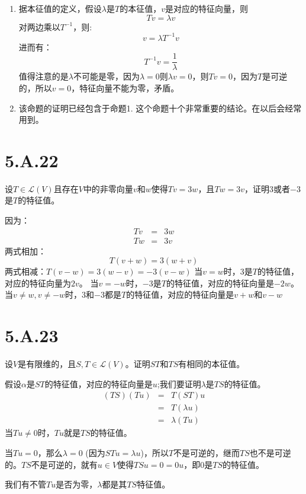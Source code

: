 \documentclass[10pt,a4paper,UTF8]{article}
\begin{document}
\begin{answer}
\begin{enumerate}
\item 据本征值的定义，假设\(\lambda\)是\(T\)的本征值，\(v\)是对应的特征向量，则\[Tv = \lambda v\]对两边乘以\(T^{-1}\)，则:\[v = \lambda T^{-1}v\] 进而有：\[T^{-1}v = \frac{1}{\lambda}\] 值得注意的是\(\lambda\)不可能是零，因为\(\lambda = 0\)则\(\lambda v = 0\)，则\(Tv = 0\)，因为\(T\)是可逆的，所以\(v = 0\)，特征向量不能为零，矛盾。

\item 该命题的证明已经包含于命题1. 这个命题十个非常重要的结论。在以后会经常用到。
\end{enumerate}
\end{answer}

\section{5.A.22}
\label{sec:orgfee0a21}


\begin{problem}
设\(T\in \mathcal{L}(V)\)且存在\(V\)中的非零向量\(v\)和\(w\)使得\(Tv = 3w\)，且\(Tw = 3v\)，证明\(3\)或者\(-3\)是\(T\)的特征值。
\end{problem}

\begin{answer}
因为：
\begin{eqnarray}
\label{eq:15}
Tv&=&3w \\
Tw&=&3v
\end{eqnarray}
两式相加：\[T(v+w) = 3(w+v)\]
两式相减：\(T(v-w) = 3(w-v) = -3(v-w)\)
当\(v=w\)时，\(3\)是\(T\)的特征值，对应的特征向量为\(2v\)。
当\(v=-w\)时，\(-3\)是\(T\)的特征值，对应的特征向量是\(-2w\)。
当\(v\neq w, v\neq -w\)时，\(3\)和\(-3\)都是\(T\)的特征值，对应的特征向量是\(v+w\)和\(v-w\)
\end{answer}

\section{5.A.23}
\label{sec:org7b0e966}


\begin{problem}
设\(V\)是有限维的，且\(S,T\in \mathcal{L}(V)\)。证明\(ST\)和\(TS\)有相同的本征值。
\end{problem}

\begin{answer}
假设\(\alpha\)是\(ST\)的特征值，对应的特征向量是\(u\);我们要证明\(\lambda\)是\(TS\)的特征值。
\begin{eqnarray}
\label{eq:17}
(TS)(Tu)&=&T(ST)u \\
&=&T(\lambda u) \\
&=&\lambda (Tu)
\end{eqnarray}
当\(Tu\neq 0\)时，\(Tu\)就是\(TS\)的特征值。

当\(Tu=0\)，那么\(\lambda = 0\) (因为\(STu = \lambda u\))，所以\(T\)不是可逆的，继而\(TS\)也不是可逆的。\(TS\)不是可逆的，就有\(u\in V\)使得\(TS u = 0 = 0u\)，即\(0\)是\(TS\)的特征值。

我们有不管\(Tu\)是否为零，\(\lambda\)都是其\(TS\)特征值。
\end{answer}
\end{document}
